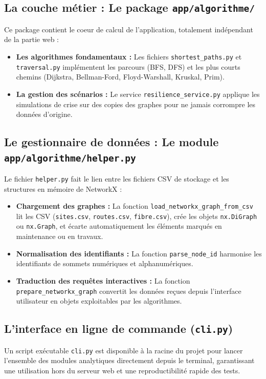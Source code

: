 \subsection{La couche métier : Le package \texttt{app/algorithme/}}
Ce package contient le coeur de calcul de l'application, totalement indépendant de la partie web :
\begin{itemize}
    \item \textbf{Les algorithmes fondamentaux :} Les fichiers \texttt{shortest\_paths.py} et \texttt{traversal.py} implémentent les parcours (BFS, DFS) et les plus courts chemins (Dijkstra, Bellman-Ford, Floyd-Warshall, Kruskal, Prim).
    \item \textbf{La gestion des scénarios :} Le service \texttt{resilience\_service.py} applique les simulations de crise sur des copies des graphes pour ne jamais corrompre les données d'origine.
\end{itemize}

\subsection{Le gestionnaire de données : Le module \texttt{app/algorithme/helper.py}}
Le fichier \texttt{helper.py} fait le lien entre les fichiers CSV de stockage et les structures en mémoire de NetworkX :
\begin{itemize}
    \item \textbf{Chargement des graphes :} La fonction \texttt{load\_networkx\_graph\_from\_csv} lit les CSV (\texttt{sites.csv}, \texttt{routes.csv}, \texttt{fibre.csv}), crée les objets \texttt{nx.DiGraph} ou \texttt{nx.Graph}, et écarte automatiquement les éléments marqués en maintenance ou en travaux.
    \item \textbf{Normalisation des identifiants :} La fonction \texttt{parse\_node\_id} harmonise les identifiants de sommets numériques et alphanumériques.
    \item \textbf{Traduction des requêtes interactives :} La fonction \texttt{prepare\_networkx\_graph} convertit les données reçues depuis l'interface utilisateur en objets exploitables par les algorithmes.
\end{itemize}

\subsection{L'interface en ligne de commande (\texttt{cli.py})}
Un script exécutable \texttt{cli.py} est disponible à la racine du projet pour lancer l'ensemble des modules analytiques directement depuis le terminal, garantissant une utilisation hors du serveur web et une reproductibilité rapide des tests.


